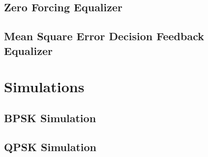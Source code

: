 \documentclass[]{article}
\begin{document}
%

\subsection{Zero Forcing Equalizer}
\label{app:zf}


\subsection{Mean Square Error Decision Feedback Equalizer}
\label{app:dfe}
%

\section{Simulations}
\subsection{BPSK Simulation}


\subsection{QPSK Simulation}

\end{document}
